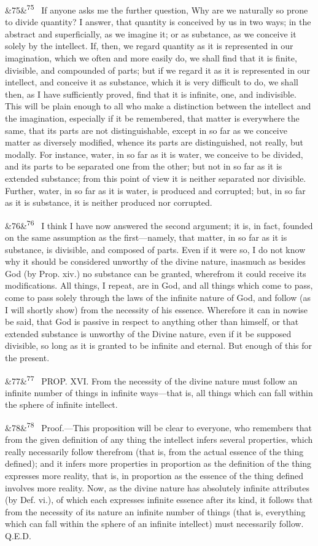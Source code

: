 \documentclass[12pt]{article}
\newcommand{\para}[1][]{\par\noindent\ifx&#1&\else\textsuperscript{\footnotesize #1}~\fi}
\begin{document}
\para[75] If anyone asks me the further question, Why are we naturally so prone to divide quantity? I answer, that quantity is conceived by us in two ways; in the abstract and superficially, as we imagine it; or as substance, as we conceive it solely by the intellect. If, then, we regard quantity as it is represented in our imagination, which we often and more easily do, we shall find that it is finite, divisible, and compounded of parts; but if we regard it as it is represented in our intellect, and conceive it as substance, which it is very difficult to do, we shall then, as I have sufficiently proved, find that it is infinite, one, and indivisible. This will be plain enough to all who make a distinction between the intellect and the imagination, especially if it be remembered, that matter is everywhere the same, that its parts are not distinguishable, except in so far as we conceive matter as diversely modified, whence its parts are distinguished, not really, but modally. For instance, water, in so far as it is water, we conceive to be divided, and its parts to be separated one from the other; but not in so far as it is extended substance; from this point of view it is neither separated nor divisible. Further, water, in so far as it is water, is produced and corrupted; but, in so far as it is substance, it is neither produced nor corrupted.

\para[76] I think I have now answered the second argument; it is, in fact, founded on the same assumption as the first---namely, that matter, in so far as it is substance, is divisible, and composed of parts. Even if it were so, I do not know why it should be considered unworthy of the divine nature, inasmuch as besides God (by Prop. xiv.) no substance can be granted, wherefrom it could receive its modifications. All things, I repeat, are in God, and all things which come to pass, come to pass solely through the laws of the infinite nature of God, and follow (as I will shortly show) from the necessity of his essence. Wherefore it can in nowise be said, that God is passive in respect to anything other than himself, or that extended substance is unworthy of the Divine nature, even if it be supposed divisible, so long as it is granted to be infinite and eternal. But enough of this for the present.

\para[77] PROP. XVI. From the necessity of the divine nature must follow an infinite number of things in infinite ways---that is, all things which can fall within the sphere of infinite intellect.

\para[78] Proof.---This proposition will be clear to everyone, who remembers that from the given definition of any thing the intellect infers several properties, which really necessarily follow therefrom (that is, from the actual essence of the thing defined); and it infers more properties in proportion as the definition of the thing expresses more reality, that is, in proportion as the essence of the thing defined involves more reality. Now, as the divine nature has absolutely infinite attributes (by Def. vi.), of which each expresses infinite essence after its kind, it follows that from the necessity of its nature an infinite number of things (that is, everything which can fall within the sphere of an infinite intellect) must necessarily follow. Q.E.D.
\end{document}
